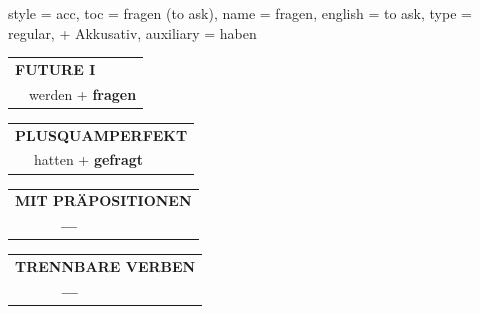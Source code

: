 \begin{verbentry}{
  style = {acc},
  toc = {fragen (to ask)},
  name = {fragen},
  english = {to ask},
  type = {regular, + Akkusativ},
  auxiliary = {haben}
}
\begin{tabular}{rl}
    \multicolumn{2}{l}{\textbf{FUTURE I} }\\
   & werden + \textbf{fragen}\\
 
  \end{tabular}
\hfill
   \begin{tabular}{rl}
      \multicolumn{2}{l}{\textbf{PLUSQUAMPERFEKT}}\\
   & hatten + \textbf{gefragt}\\
  \end{tabular}
  
  
\vspace{10pt}

\begin{tabular}{lll}
\multicolumn{3}{l}{\textbf{MIT PRÄPOSITIONEN}}\\
& \textbf{---} & \\
\end{tabular}
\hfill
\begin{tabular}{lll}
\multicolumn{3}{l}{\textbf{TRENNBARE VERBEN}}\\
& \textbf{---} & \\
\end{tabular}
\vspace{-5pt}
\end{verbentry}

